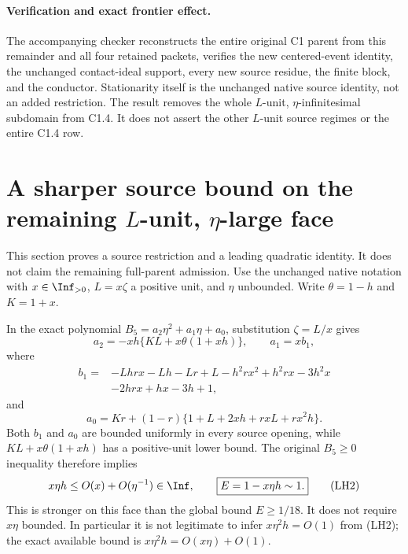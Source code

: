 \paragraph{Verification and exact frontier effect.}
The accompanying checker reconstructs the entire original C1 parent
from this remainder and all four retained packets, verifies the new
centered-event identity, the unchanged contact-ideal support, every
new source residue, the finite block, and the conductor.  Stationarity
itself is the unchanged native source identity, not an added
restriction.  The result removes the whole $L$-unit, $\eta$-infinitesimal
subdomain from C1.4.  It does not assert the other $L$-unit source
regimes or the entire C1.4 row.


\section{\texorpdfstring{A sharper source bound on the remaining $L$-unit, $\eta$-large face}{A sharper source bound on the remaining L-unit, eta-large face}}
\label{component:p57d751e20564}

\label{p57d751e20564:sec:r7-c1-L-unit-eta-large-frontier}

This section proves a source restriction and a leading quadratic
identity.  It does not claim the remaining full-parent admission.
Use the unchanged native notation with $x\in\Inf_{>0}$,
$L=x\zeta$ a positive unit, and $\eta$ unbounded.  Write
$\theta=1-h$ and $K=1+x$.

In the exact polynomial $B_5=a_2\eta^2+a_1\eta+a_0$, substitution
$\zeta=L/x$ gives
\[
 a_2=-xh\{KL+x\theta(1+xh)\},\qquad a_1=xb_1,
                                                               \tag{LH1}
\]
where
\[
\begin{split}
 b_1={}&-Lhrx-Lh-Lr+L-h^2rx^2+h^2rx-3h^2x\\
       &-2hrx+hx-3h+1,
\end{split}
\]
and
\[
 a_0=Kr+(1-r)\{1+L+2xh+rxL+rx^2h\}.
\]
Both $b_1$ and $a_0$ are bounded uniformly in every source opening,
while $KL+x\theta(1+xh)$ has a positive-unit lower bound.
The original $B_5\ge0$ inequality therefore implies
\[
 x\eta h\le O(x)+O(\eta^{-1})\in\Inf,
 \qquad\boxed{E=1-x\eta h\sim1.}                       \tag{LH2}
\]
This is stronger on this face than the global bound $E\ge1/18$.
It does not require $x\eta$ bounded.  In particular it is not
legitimate to infer $x\eta^2h=O(1)$ from (LH2); the exact available
bound is $x\eta^2h=O(x\eta)+O(1)$.

